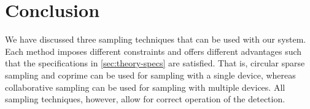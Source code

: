\documentclass[a4paper, openany, oneside]{memoir}
\begin{document}
\section{Conclusion}
We have discussed three sampling techniques that can be used with our system. Each method imposes different constraints and offers different advantages such that the specifications in \cref{sec:theory-specs} are satisfied. That is, circular sparse sampling and coprime can be used for sampling with a single device, whereas collaborative sampling can be used for sampling with multiple devices.  All sampling techniques, however, allow for correct operation of the detection.
\end{document}
